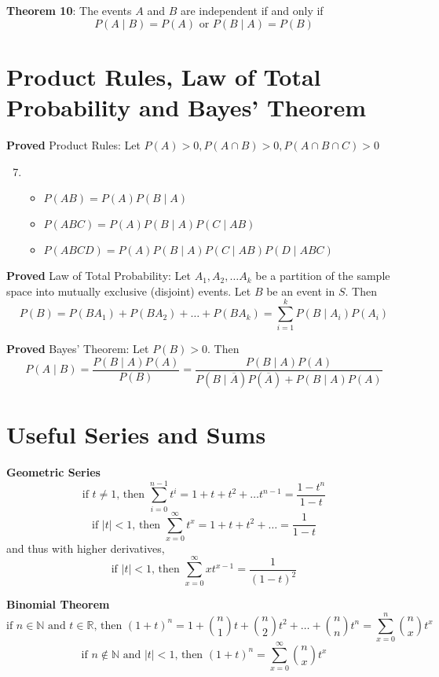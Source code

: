 \documentclass[11pt,notitlepage]{report}
\begin{document}
\textbf{Theorem 10}: The events $A$ and $B$ are independent if and only if 
$$P(A \mid B) = P(A) \text{ or } P(B \mid A) = P(B)$$


\section{Product Rules, Law of Total Probability and Bayes’ Theorem}

\textbf{Proved} Product Rules: Let $P(A) > 0, P(A \cap B) > 0, P(A \cap B \cap C) > 0$\begin{enumerate}
    \setcounter{enumi}{6}
    \item
    \begin{itemize}
    \item $P(AB) = P(A)P(B \mid A)$
    \item $P(ABC) = P(A)P(B \mid A)P(C \mid AB)$
    \item $P(ABCD) = P(A)P(B \mid A)P(C \mid AB)P(D \mid ABC)$
   \end{itemize}
\end{enumerate}

\textbf{Proved} Law of Total Probability: Let $A_1, A_2, \dots A_k$ be a partition of the sample space into mutually exclusive (disjoint) events. Let $B$ be an event in $S$. Then
$$P(B) = P(BA_1) + P(BA_2) + \dots + P(BA_k) = \sum^{k}_{i=1} P(B \mid A_i)P(A_i)$$

\textbf{Proved} Bayes’ Theorem: Let $P(B) > 0$. Then
$$P(A \mid B) = \frac{P(B \mid A)P(A)}{P(B)} = \frac{P(B \mid A)P(A)}{P(B \mid \overline A)P(\overline A)+P(B \mid A)P(A)}$$


\section{Useful Series and Sums}

\textbf{Geometric Series} 
$$\text{if $t \ne 1$, then }\sum_{i = 0}^{n-1} t^i = 1 + t + t^2 + \dots t^{n-1} = \frac{1-t^n}{1-t}$$
$$\text{if $|t| < 1$, then }\sum_{x = 0}^{\infty} t^x = 1 + t + t^2 + \dots = \frac{1}{1-t}$$
and thus with higher derivatives,
$$\text{if $|t| < 1$, then }\sum_{x = 0}^{\infty} xt^{x-1} = \frac{1}{(1-t)^2}$$

\textbf{Binomial Theorem}
$$\text{if $n \in \mathbb N$ and $t \in \mathbb R$, then }(1+t)^n = 1 + \binom{n}{1}t + \binom{n}{2}t^2 + \dots + \binom{n}{n}t^n = \sum_{x=0}^n \binom{n}{x}t^x$$
$$\text{if $n \not \in \mathbb N$ and $|t| < 1$, then }(1+t)^n = \sum_{x=0}^{\infty} \binom{n}{x}t^x$$
\end{document}
